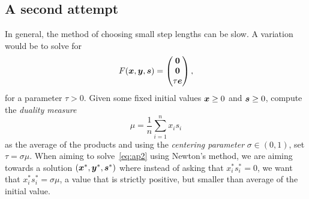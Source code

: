 \subsection{A second attempt}
In general, the method of choosing small step lengths can be slow. A variation would be to solve for
\begin{equation}\label{eq:ap2}
 F(\bm{x},\bm{y},\bm{s}) = \begin{pmatrix}
                               \bm{0}\\ \bm{0} \\ \tau \bm{e}
                              \end{pmatrix},
\end{equation}
for a parameter $\tau>0$. Given some fixed initial values $\bm{x}\geq 0$ and $\bm{s}\geq 0$, compute the {\em duality measure}
\begin{equation*}
 \mu = \frac{1}{n} \sum_{i=1}^n x_is_i
\end{equation*}
as the average of the products and using the {\em centering parameter} $\sigma\in (0,1)$, set $\tau = \sigma \mu$. When aiming to solve~\eqref{eq:ap2} using Newton's method, we are aiming towards a solution $(\bm{x}^*,\bm{y}^*,\bm{s}^*)$ where instead of 
asking that $x_i^*s_i^*=0$, we want that $x_i^*s_i^*=\sigma \mu$, a value that is strictly positive, but smaller than average of the initial value.

